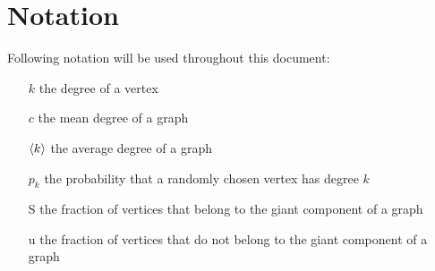 \chapter*{Notation} %
\label{cha:notation}

Following notation will be used throughout this document:
\begin{itemize}
	\item[$k$] the degree of a vertex
	\item[$c$] the mean degree of a graph
	\item[$\left< k \right>$] the average degree of a graph
	\item[$p_k$] the probability that a randomly chosen vertex has degree $k$
	\item[S] the fraction of vertices that belong to the giant component of a graph
	\item[u] the fraction of vertices that do not belong to the giant component of a graph
\end{itemize}
